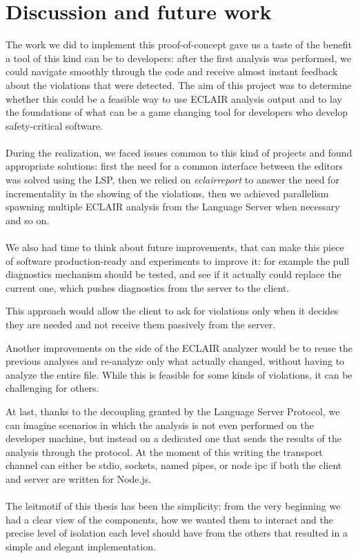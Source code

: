 \chapter{Discussion and future work}\label{chapter:discussion-and-future-work}
The work we did to implement this proof-of-concept gave us a taste of the benefit a tool of this kind can be to developers: after the first analysis was performed, we could navigate smoothly through the code and receive almost instant feedback about the violations that were detected. 
The aim of this project was to determine whether this could be a feasible way to use ECLAIR analysis output and to lay the foundations of what can be a game changing tool for developers who develop safety-critical software.
\\\\
During the realization, we faced issues common to this kind of projects and found appropriate solutions: first the need for a common interface between the editors was solved using the LSP, then we relied on \emph{eclair\textunderscore	report} to answer the need for incrementality in the showing of the violations, then we achieved parallelism spawning multiple ECLAIR analysis from the Language Server when necessary and so on.
\\\\
We also had time to think about future improvements, that can make this piece of software production-ready and experiments to improve it: for example the pull diagnostics mechanism should be tested, and see if it actually could replace the current one, which pushes diagnostics from the server to the client. 

This approach would allow the client to ask for violations only when it decides they are needed and not receive them passively from the server. 

Another improvements on the side of the ECLAIR analyzer would be to reuse the previous analyses and re-analyze only what actually changed, without having to analyze the entire file. 
While this is feasible for some kinds of violations, it can be challenging for others.

At last, thanks to the decoupling granted by the Language Server Protocol, we can imagine scenarios in which the analysis is not even performed on the developer machine, but instead on a dedicated one that sends the results of the analysis through the protocol. 
At the moment of this writing the transport channel can either be stdio, sockets, named pipes, or node ipc if both the client and server are written for Node.js. 
\\\\
The leitmotif of this thesis has been the simplicity: from the very beginning we had a clear view of the components, how we wanted them to interact and the precise level of isolation each level should have from the others that resulted in a simple and elegant implementation.

